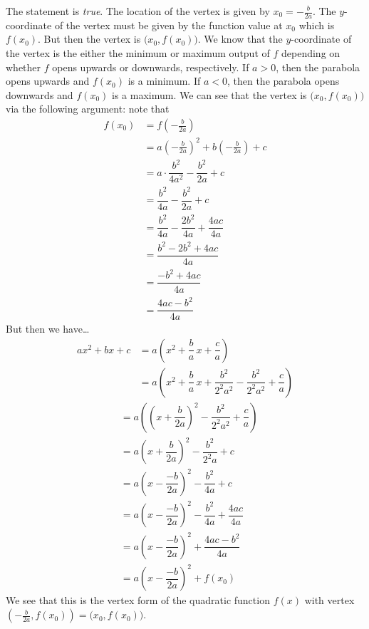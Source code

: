 \documentclass[11pt,letterpaper]{article}
\begin{document}
\sol The statement is \textit{true}. The location of the vertex is given by $x_0= -\frac{b}{2a}$. The $y$-coordinate of the vertex must be given by the function value at $x_0$ which is $f(x_0)$. But then the vertex is $\big(x_0, f(x_0) \big)$. We know that the $y$-coordinate of the vertex is the either the minimum or maximum output of $f$ depending on whether $f$ opens upwards or downwards, respectively. If $a > 0$, then the parabola opens upwards and $f(x_0)$ is a minimum. If $a < 0$, then the parabola opens downwards and $f(x_0)$ is a maximum. We can see that the vertex is $\big(x_0, f(x_0) \big)$ via the following argument: note that
	\[
	\begin{aligned}
	f(x_0)&= f \left(-\frac{b}{2a} \right) \\ 
	&= a \left(-\frac{b}{2a} \right)^2 + b \left(-\frac{b}{2a} \right) + c \\
	&= a \cdot \dfrac{b^2}{4a^2} - \dfrac{b^2}{2a} + c \\
	&= \dfrac{b^2}{4a} - \dfrac{b^2}{2a} + c \\
	&= \dfrac{b^2}{4a} - \dfrac{2b^2}{4a} + \dfrac{4ac}{4a} \\
	&= \dfrac{b^2 - 2b^2 + 4ac}{4a} \\
	&= \dfrac{-b^2 + 4ac}{4a} \\
	&= \dfrac{4ac - b^2}{4a}
	\end{aligned}
	\]
But then we have\dots
	\[
	\begin{aligned}
	ax^2 + bx + c&= a \left(x^2 + \dfrac{b}{a} \,x + \dfrac{c}{a} \right) \\
	&= a \left(x^2 + \dfrac{b}{a} \,x + \dfrac{b^2}{2^2a^2} - \dfrac{b^2}{2^2a^2} + \dfrac{c}{a} \right) 
	\end{aligned}
	\]
	\[
	\begin{aligned}
	&= a \left( \left(x + \dfrac{b}{2a} \right)^2 - \dfrac{b^2}{2^2a^2} + \dfrac{c}{a} \right) \\
	&= a \left(x + \dfrac{b}{2a} \right)^2 - \dfrac{b^2}{2^2a} + c \\
	&= a \left(x - \dfrac{-b}{2a} \right)^2 - \dfrac{b^2}{4a} + c \\
	&= a \left(x - \dfrac{-b}{2a} \right)^2 - \dfrac{b^2}{4a} + \dfrac{4ac}{4a} \\
	&= a \left(x - \dfrac{-b}{2a} \right)^2 + \dfrac{4ac - b^2}{4a} \\
	&= a \left(x - \dfrac{-b}{2a} \right)^2 + f(x_0)
	\end{aligned}
	\]
We see that this is the vertex form of the quadratic function $f(x)$ with vertex $(-\frac{b}{2a}, f(x_0))= \big(x_0, f(x_0) \big)$. \pvspace{1.3cm}






\end{document}
